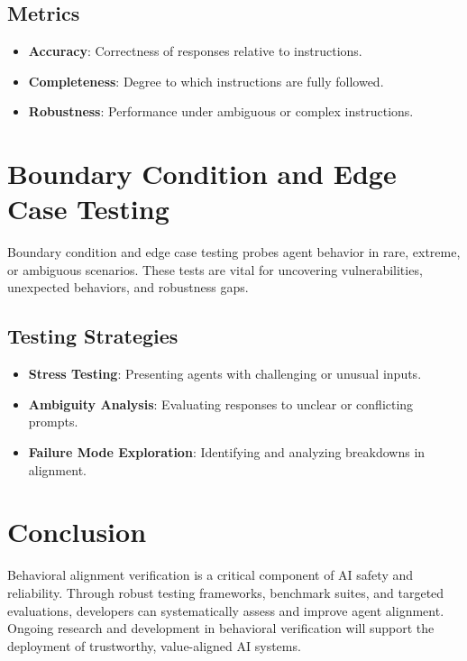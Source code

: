 \begin{TNtwocol}
\subsection{Metrics}
\begin{itemize}
    \item \textbf{Accuracy}: Correctness of responses relative to instructions.
    \item \textbf{Completeness}: Degree to which instructions are fully followed.
    \item \textbf{Robustness}: Performance under ambiguous or complex instructions.
\end{itemize}

\section{Boundary Condition and Edge Case Testing}
Boundary condition and edge case testing probes agent behavior in rare, extreme, or ambiguous scenarios. These tests are vital for uncovering vulnerabilities, unexpected behaviors, and robustness gaps.

\subsection{Testing Strategies}
\begin{itemize}
    \item \textbf{Stress Testing}: Presenting agents with challenging or unusual inputs.
    \item \textbf{Ambiguity Analysis}: Evaluating responses to unclear or conflicting prompts.
    \item \textbf{Failure Mode Exploration}: Identifying and analyzing breakdowns in alignment.
\end{itemize}

\section{Conclusion}
Behavioral alignment verification is a critical component of AI safety and reliability. Through robust testing frameworks, benchmark suites, and targeted evaluations, developers can systematically assess and improve agent alignment. Ongoing research and development in behavioral verification will support the deployment of trustworthy, value-aligned AI systems.

\end{TNtwocol}
